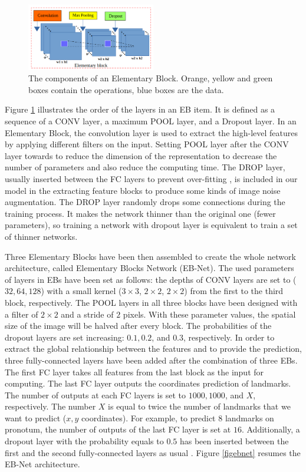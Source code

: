\documentclass[review]{elsarticle}
\begin{document}
\begin{figure}[h!]
	\centering
	\includegraphics[width=0.5\textwidth]{images/eblock}
	\caption{The components of an Elementary Block. Orange, yellow
        and green boxes contain the operations, blue boxes are the data.}
	\label{figeblock}
\end{figure}

Figure \ref{figeblock} illustrates the order of the layers in an EB item. It is defined as a sequence of a CONV layer, a maximum POOL layer, and a Dropout layer. In an Elementary Block, the convolution layer is used to extract the high-level features by applying different filters on the input. Setting POOL layer after the CONV layer towards to reduce the dimension of the representation to decrease the number of parameters and also reduce the computing time. The DROP layer, usually inserted between the FC layers to prevent over-fitting \cite{lecun2015deep, krizhevsky2012imagenet}, is included in our model in the extracting feature blocks to produce some kinds of image noise augmentation. The DROP layer randomly drops some connections during the training process. It makes the network thinner than the original one (fewer parameters), so training a network with dropout layer is equivalent to train a set of thinner networks.

Three Elementary Blocks have been then assembled to create the whole network
architecture, called Elementary Blocks Network (EB-Net). The used
parameters of layers in EBs have been set as follows: the depths of
CONV layers are set to ($32, 64, 128$) with a small kernel
($3 \times 3$, $2 \times 2$, $2 \times 2$) from the first to the third
block, respectively. The POOL layers in all three blocks have been
designed with a filter of $2 \times 2$ and a stride of $2$
pixels. With these parameter values, the spatial size of the image
will be halved after every block. The probabilities of the dropout
layers are set increasing: $0.1, 0.2$, and $0.3$, respectively. In
order to extract the global relationship between the features and to
provide the prediction, three fully-connected layers have been added
after the combination of three EBs. The first FC layer takes all features
from the last block as the input for computing. The last FC layer
outputs the coordinates prediction of landmarks. The number of outputs
at each FC layers is set to $1000, 1000$, and $X$, respectively. The
number $X$ is equal to twice the number of landmarks that we want to
predict ($x, y$ coordinates). For example, to predict $8$ landmarks on
pronotum, the number of outputs of the last FC
layer is set at $16$. Additionally, a dropout layer with the probability equals to
$0.5$ has been inserted between the first and the second
fully-connected layers as usual 
\cite{hinton2012improving}. Figure \ref{figebnet} resumes the EB-Net
architecture.
\end{document}
